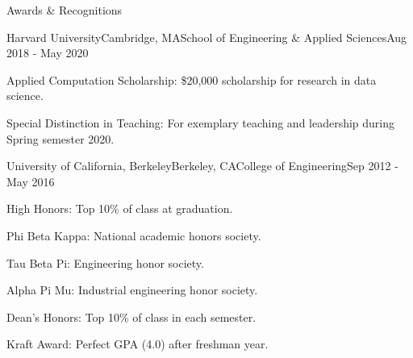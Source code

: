 \documentclass{resume} %
\begin{document}
\begin{rSection}{Awards \& Recognitions}

\begin{rSubsection}{Harvard University}{Cambridge, MA}{School of Engineering \& Applied Sciences}{Aug 2018 - May 2020}

\item Applied Computation Scholarship: \$20,000 scholarship for research in data science.
\item Special Distinction in Teaching: For exemplary teaching and leadership during Spring semester 2020.

\end{rSubsection}

\begin{rSubsection}{University of California, Berkeley}{Berkeley, CA}{College of Engineering}{Sep 2012 - May 2016}

\item High Honors: Top 10\% of class at graduation.
\item Phi Beta Kappa: National academic honors society.
\item Tau Beta Pi: Engineering honor society.
\item Alpha Pi Mu: Industrial engineering honor society.
\item Dean's Honors: Top 10\% of class in each semester.
\item Kraft Award: Perfect GPA (4.0) after freshman year.

\end{rSubsection}




\end{rSection}

\end{document}

